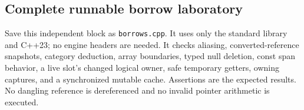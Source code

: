 \subsection{Complete runnable borrow laboratory}\label{05-engine-i-ch004-complete-runnable-borrow-laboratory}

\hypertarget{05-engine-i-ch004-complete-runnable-borrow-laboratory}{}

Save this independent block as \texttt{borrows.cpp}. It uses only the standard library and C++23; no engine headers are needed. It checks aliasing, converted-reference snapshots, category deduction, array boundaries, typed null deletion, const span behavior, a live slot's changed logical owner, safe temporary getters, owning captures, and a synchronized mutable cache. Assertions are the expected results. No dangling reference is dereferenced and no invalid pointer arithmetic is executed.

